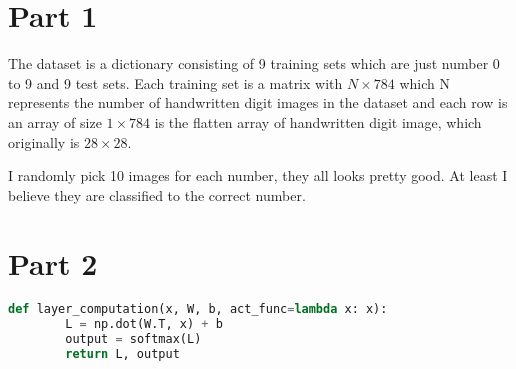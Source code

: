 \documentclass[12pt]{article}
\begin{document}
\section{Part 1}
The dataset is a dictionary consisting of 9 training sets which are just number 0 to 9 and 9 test sets. Each training set is a matrix with $N\times 784$ which N represents the number of handwritten digit images in the dataset and each row is an array of size $1\times 784$ is the flatten array of handwritten digit image, which originally is $28\times 28$.

I randomly pick 10 images for each number, they all looks pretty good. At least I believe they are classified to the correct number.

\section{Part 2}
\begin{lstlisting}[language=Python]
    def layer_computation(x, W, b, act_func=lambda x: x):
        L = np.dot(W.T, x) + b
      	output = softmax(L)
      	return L, output
\end{lstlisting}
\end{document}
